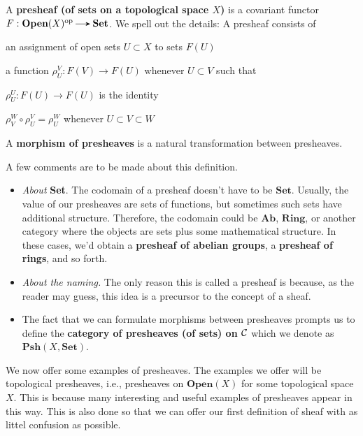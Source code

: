 \begin{definition}
    A \textbf{presheaf (of sets on a topological space $X$)} 
    is a covariant functor $F: \textbf{Open}(X)\op \to \textbf{Set}$. 
    We spell out the details: A presheaf consists of 
    \begin{description}
        \itemsep 0.25cm
        \item[(PS1)] an assignment of open sets $U \subset X$ to sets $F(U)$
        \item[(PS2)] a function $\rho_{U}^{V}: F(V) \to F(U)$ whenever $U \subset V$
        such that\\[-0.3cm]
        \begin{description}
            \itemsep 0.25cm
            \item[(Identity)] $\rho_{U}^{U}: F(U) \to F(U)$ is the identity
            \item[(Composition)] $\rho_V^W \circ \rho_U^V = \rho_U^W$ whenever $U \subset V \subset W$
        \end{description}
    \end{description}
    \noindent A \textbf{morphism of presheaves} is a natural transformation between presheaves.
\end{definition}

A few comments are to be made about this definition. 

\begin{itemize}
    \item \emph{About} \textbf{Set}. The codomain of a presheaf doesn't have to be $\textbf{Set}$.
    Usually, the value of our presheaves are sets of functions, but sometimes such sets have additional 
    structure. Therefore, the codomain could be $\textbf{Ab}$, $\textbf{Ring}$, or another category 
    where the objects are sets plus some mathematical structure. In these cases, we'd obtain a \textbf{presheaf of abelian groups}, a
    \textbf{presheaf of rings}, and so forth.
    \item \emph{About the naming.} The only reason this is called a presheaf is because, 
    as the reader may guess, this idea is a precursor to the concept of a sheaf. 
    \item The fact that we can formulate morphisms between presheaves prompts us to 
    define the \textbf{category of presheaves (of sets) on $\mathcal{C}$} which we denote as
    $\textbf{Psh}(X, \textbf{Set})$.
\end{itemize}

We now offer some examples of presheaves. The examples we offer will be topological presheaves, 
i.e., presheaves on $\textbf{Open}(X)$ for some topological space $X$. This is because 
many interesting and useful examples of presheaves appear in this way. This is also done 
so that we can offer our first definition of sheaf with as littel confusion as possible. 

